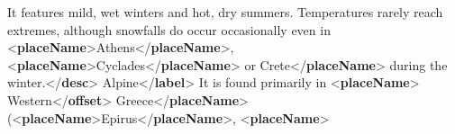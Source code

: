 \begin{shaded}
\hspace*{1em}\hspace*{1em}It features mild, wet winters and hot, dry summers. Temperatures rarely reach extremes, although snowfalls\mbox{}\newline 
\hspace*{1em}\hspace*{1em}\hspace*{1em}\hspace*{1em}\hspace*{1em}\hspace*{1em} do occur occasionally even in {<\textbf{placeName}>}Athens{</\textbf{placeName}>}, {<\textbf{placeName}>}Cyclades{</\textbf{placeName}>} or\mbox{}\newline 
\hspace*{1em}\hspace*{1em}Crete{</\textbf{placeName}>} during the winter.{</\textbf{desc}>}\mbox{}\newline 
\hspace*{1em}\mbox{}\newline 
\hspace*{1em}\mbox{}\newline 
\hspace*{1em}\hspace*{1em}Alpine{</\textbf{label}>}\mbox{}\newline 
\hspace*{1em}\hspace*{1em}It is found primarily in {<\textbf{placeName}>}\mbox{}\newline 
\hspace*{1em}\hspace*{1em}\hspace*{1em}\hspace*{1em}Western{</\textbf{offset}>} Greece{</\textbf{placeName}>}\mbox{}\newline 
\hspace*{1em}\hspace*{1em}\hspace*{1em}\hspace*{1em}\hspace*{1em}\hspace*{1em} ({<\textbf{placeName}>}Epirus{</\textbf{placeName}>}, {<\textbf{placeName}>}\mbox{}\newline 

\end{shaded}
